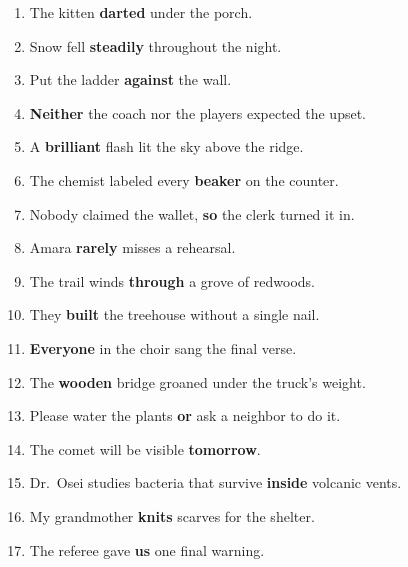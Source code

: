 \documentclass[11pt]{article}
\newcommand{\ansline}{\underline{\hspace{1.1in}}}
\begin{document}
\begin{enumerate}
  \vspace{2pt}
  \item The kitten \textbf{darted} under the porch. \ansline
  \vspace{2pt}
  \item Snow fell \textbf{steadily} throughout the night. \ansline
  \vspace{2pt}
  \item Put the ladder \textbf{against} the wall. \ansline
  \vspace{2pt}
  \item \textbf{Neither} the coach nor the players expected the upset. \ansline
  \vspace{2pt}
  \item A \textbf{brilliant} flash lit the sky above the ridge. \ansline
  \vspace{2pt}
  \item The chemist labeled every \textbf{beaker} on the counter. \ansline
  \vspace{2pt}
  \item Nobody claimed the wallet, \textbf{so} the clerk turned it in. \ansline
  \vspace{2pt}
  \item Amara \textbf{rarely} misses a rehearsal. \ansline
  \vspace{2pt}
  \item The trail winds \textbf{through} a grove of redwoods. \ansline
  \vspace{2pt}
  \item They \textbf{built} the treehouse without a single nail. \ansline
  \vspace{2pt}
  \item \textbf{Everyone} in the choir sang the final verse. \ansline
  \vspace{2pt}
  \item The \textbf{wooden} bridge groaned under the truck's weight. \ansline
  \vspace{2pt}
  \item Please water the plants \textbf{or} ask a neighbor to do it. \ansline
  \vspace{2pt}
  \item The comet will be visible \textbf{tomorrow}. \ansline
  \vspace{2pt}
  \item Dr.\ Osei studies bacteria that survive \textbf{inside} volcanic vents. \ansline
  \vspace{2pt}
  \item My grandmother \textbf{knits} scarves for the shelter. \ansline
  \vspace{2pt}
  \item The referee gave \textbf{us} one final warning. \ansline
  \vspace{2pt}
\end{enumerate}
\end{document}
